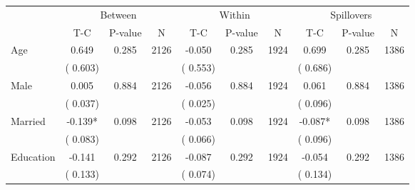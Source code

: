 
\begin{tabular}{l*{9}{c}}\hline&\multicolumn{3}{c}{Between}&\multicolumn{3}{c}{Within}&\multicolumn{3}{c}{Spillovers} \\ \cmidrule(r){2-4}\cmidrule(l){5-7}\cmidrule(l){8-10} & {T-C} & {P-value} & {N} & {T-C} & {P-value} & {N}  & {T-C} & {P-value} & {N}  \\ \midrule
 Age                 &              0.649          &        0.285 & 2126          &             -0.050          &        0.285 & 1924          &        0.699 &        0.285 & 1386                                 \\ 
                               &        (       0.603) & &                                                                 &       (       0.553) & &                                                          &       (       0.686)      & &                             \\ 
 Male                 &              0.005          &        0.884 & 2126          &             -0.056 &        0.884 & 1924                   &        0.061 &        0.884 & 1386                                 \\ 
                               &        (       0.037) & &                                                                 &       (       0.025) & &                                                          &       (       0.096) & &                                          \\ 
 Married                 &             -0.139*          &        0.098 & 2126          &             -0.053 &        0.098 & 1924                   &       -0.087* &        0.098 & 1386                                 \\ 
                               &        (       0.083) & &                                                                 &       (       0.066) & &                                                          &       (       0.096) & &                                          \\ 
 Education                 &             -0.141          &        0.292 & 2126          &             -0.087 &        0.292 & 1924                   &       -0.054 &        0.292 & 1386                                 \\ 
                               &        (       0.133) & &                                                                 &       (       0.074) & &                                                          &       (       0.134) & &                                          \\ 

\end{tabular}
